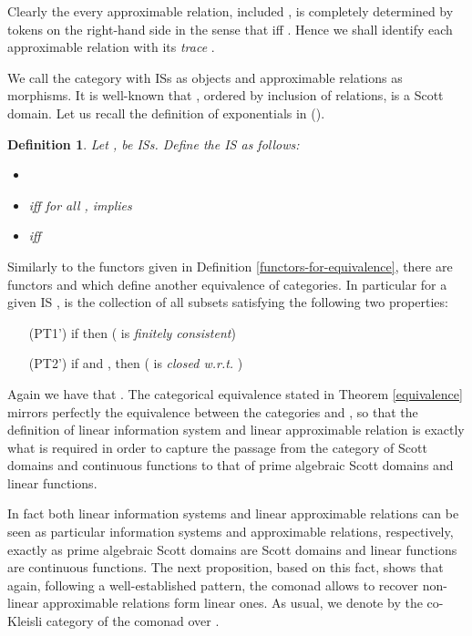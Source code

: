 \documentclass[copyright,creativecommons]{eptcs}
\newtheorem{definition}[theorem]{Definition}
\begin{document}
Clearly the every approximable relation, included , is completely determined by tokens on the right-hand side in the sense that  iff . Hence we shall identify each approximable relation  with its \emph{trace} .

\medskip

We call  the category with ISs as objects and approximable relations as morphisms. It is well-known that , ordered by inclusion of relations, is a Scott domain. Let us recall the definition of exponentials in  (\cite{Larsen91}).

\begin{definition}
Let ,  be ISs. Define the IS  as follows:
\begin{itemize}
\item 
\item  iff for all ,  implies 
\item  iff 
\end{itemize}
\end{definition}

Similarly to the functors given in Definition \ref{functors-for-equivalence}, there are functors  and \mbox{} which define another equivalence of categories. In particular for a given IS ,  is the collection of all subsets  satisfying the following two properties:
\begin{itemize}
\item[(PT1')] if  then  ( is \emph{finitely consistent})
\item[(PT2')] if  and , then  ( is \emph{closed w.r.t.} )
\end{itemize}

Again we have that . The categorical equivalence stated in Theorem \ref{equivalence} mirrors perfectly the equivalence between the categories  and , so that the definition of linear information system and linear approximable relation is exactly what is required in order to capture the passage from the category of Scott domains and continuous functions to that of prime algebraic Scott domains and linear functions.

In fact both linear information systems and linear approximable relations can be seen as particular information systems and approximable relations, respectively, exactly as prime algebraic Scott domains are Scott domains and linear functions are continuous functions. The next proposition, based on this fact, shows that again, following a well-established pattern, the comonad  allows to recover non-linear approximable relations form linear ones. As usual, we denote by  the co-Kleisli category of the comonad  over .
\end{document}
